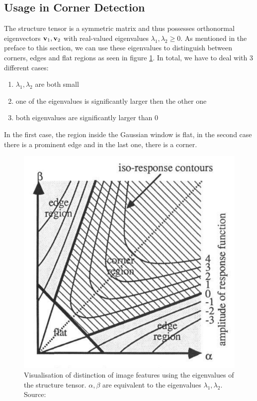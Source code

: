 \subsection{Usage in Corner Detection}\label{sub:Corner}
The structure tensor is a symmetric matrix and thus possesses orthonormal eigenvectors $\bold v_1,
\bold v_2$ with real-valued eigenvalues $\lambda_1, \lambda_2 \geq 0$. \cite{ipcv19-13} As
mentioned in the preface to this section, we can use these eigenvalues to distinguish between
corners, edges and flat regions as seen in figure \ref{fig:Structure}.
In total, we have to deal with 3 different cases:
\begin{enumerate}
    \item $\lambda_1, \lambda_2$ are both small
    \item one of the eigenvalues is significantly larger then the other one
    \item both eigenvalues are significantly larger than 0
\end{enumerate}
In the first case, the region inside the Gaussian window is flat, in the second case there is a
prominent edge and in the last one, there is a corner. 
\begin{figure}[h]
    \centering
    \includegraphics[height=0.25\pdfpageheight]{../Images/structure_tensor.png}
    \caption{Visualisation of distinction of image features using the eigenvalues of the structure
        tensor. $\alpha, \beta$ are equivalent to the eigenvalues $\lambda_1, \lambda_2$. Source: \cite{harris88}}\label{fig:Structure}
\end{figure}
